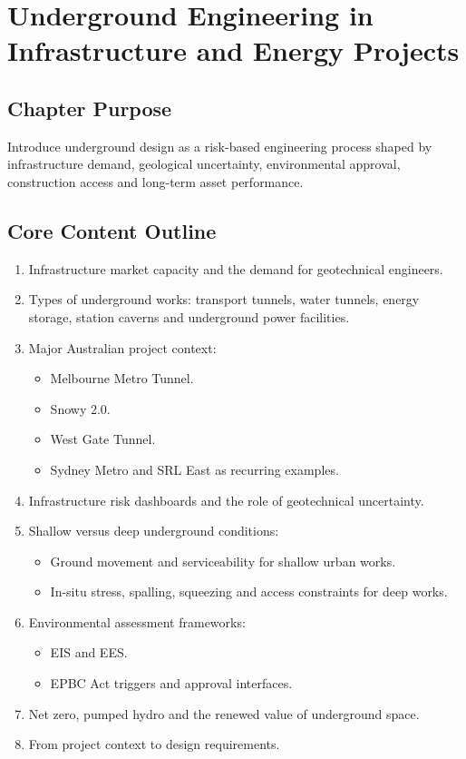 \documentclass[12pt,oneside]{book}
\begin{document}
\chapter{Underground Engineering in Infrastructure and Energy Projects}

\section{Chapter Purpose}
Introduce underground design as a risk-based engineering process shaped by infrastructure demand, geological uncertainty, environmental approval, construction access and long-term asset performance.

\section{Core Content Outline}
\begin{enumerate}
    \item Infrastructure market capacity and the demand for geotechnical engineers.
    \item Types of underground works: transport tunnels, water tunnels, energy storage, station caverns and underground power facilities.
    \item Major Australian project context:
    \begin{itemize}
        \item Melbourne Metro Tunnel.
        \item Snowy 2.0.
        \item West Gate Tunnel.
        \item Sydney Metro and SRL East as recurring examples.
    \end{itemize}
    \item Infrastructure risk dashboards and the role of geotechnical uncertainty.
    \item Shallow versus deep underground conditions:
    \begin{itemize}
        \item Ground movement and serviceability for shallow urban works.
        \item In-situ stress, spalling, squeezing and access constraints for deep works.
    \end{itemize}
    \item Environmental assessment frameworks:
    \begin{itemize}
        \item EIS and EES.
        \item EPBC Act triggers and approval interfaces.
    \end{itemize}
    \item Net zero, pumped hydro and the renewed value of underground space.
    \item From project context to design requirements.
\end{enumerate}
\end{document}

